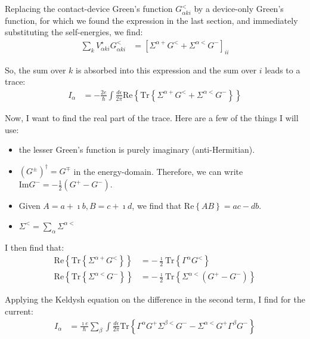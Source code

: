 Replacing the contact-device Green's function $G^<_{\alpha ki}$ by a device-only Green's function, for which we found the expression in the last section, and immediately substituting the self-energies, we find:
\begin{align*}
\sum_{k} V^\star_{\alpha ki} G^<_{\alpha ki} &= \left[\Sigma^{\alpha+} G^< + \Sigma^{\alpha <} G^-\right]_{ii}
\end{align*}

So, the sum over $k$ is absorbed into this expression and the sum over $i$ leads to a trace:
\begin{align*}
I_\alpha &= -\frac{2e}{\hbar} \int \frac{d\epsilon}{2\pi} \text{Re} \left\{ \text{Tr} \left \{ \Sigma^{\alpha+} G^< + \Sigma^{\alpha <} G^-\right\}\right\}
\end{align*}

Now, I want to find the real part of the trace. Here are a few of the things I will use:
\begin{itemize}
\item the lesser Green's function is purely imaginary (anti-Hermitian). 
\item $(G^\pm)^\dagger = G^\mp$ in the energy-domain. Therefore, we can write $\text{Im} G^- = - \frac{1}{2} \left( G^+ - G^- \right)$.
\item Given $A=a+\imath b, B = c + \imath d$, we find that $\text{Re}\left\{ AB \right\} = ac - db$.
\item $\Sigma^< = \sum_\alpha \Sigma^{\alpha<}$
\end{itemize}

I then find that:
\begin{align*}
\text{Re}\left\{\text{Tr}\left\{ \Sigma^{\alpha+} G^<\right\}\right\} &= - \frac{\imath}{2} \text{Tr}\left\{ \Gamma^\alpha G^< \right\} \\
\text{Re}\left\{\text{Tr}\left\{ \Sigma^{\alpha<} G^-\right\}\right\} &= - \frac{\imath}{2} \text{Tr}\left\{\Sigma^{\alpha<} \left(G^+ - G^-\right)\right\}
\end{align*}

Applying the Keldysh equation on the difference in the second term, I find for the current:
\begin{align*}
I_\alpha &= \frac{\imath e}{\hbar} \sum_\beta \int \frac{d\epsilon}{2\pi} \text{Tr}\left\{ \Gamma^\alpha G^+ \Sigma^{\beta <}G^- - \Sigma^{\alpha<}G^+\Gamma^\beta G^- \right\}
\end{align*}

